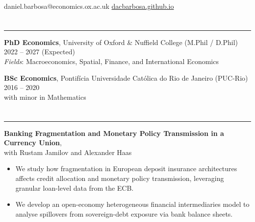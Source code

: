\documentclass[letterpaper, 11pt]{article}
\begin{document}


\noindent
daniel.barbosa@economics.ox.ac.uk \hfill \href{https://dacbarbosa.github.io}{dacbarbosa.github.io}



\section*{\color{OxfordBlue}{Education}}

\vspace{-0.6cm}
\noindent\rule{\textwidth}{0.4pt}

\vspace{0.1cm}

\noindent
\textbf{PhD Economics}, University of Oxford \& Nuffield College (M.Phil / D.Phil) \hfill 2022 -- 2027 (Expected)\\
\emph{Fields}: Macroeconomics, Spatial, Finance, and International Economics\\

\vspace{-0.2cm}

\noindent
\textbf{BSc Economics}, Pontif\'icia Universidade Cat\'olica do Rio de Janeiro (PUC-Rio) \hfill 2016 -- 2020\\
with minor in Mathematics
\vspace{-0.2cm}




\section*{\color{OxfordBlue}{Research Papers \& Book Chapters}}

\vspace{-0.6cm}
\noindent\rule{\textwidth}{0.4pt}

\vspace{0.1cm}

 \textbf{Banking Fragmentation and Monetary Policy Transmission in a Currency Union}, \\with Rustam Jamilov and Alexander Haas
\vspace{-0.2cm}
\begin{itemize}
	\item We study how fragmentation in European deposit insurance architectures affects credit allocation and monetary policy transmission, leveraging granular loan-level data from the ECB.
	\vspace{-0.2cm}
	\item We develop an open-economy heterogeneous financial intermediaries model to analyse spillovers from sovereign-debt exposure via bank balance sheets.
\end{itemize}
\end{document}
